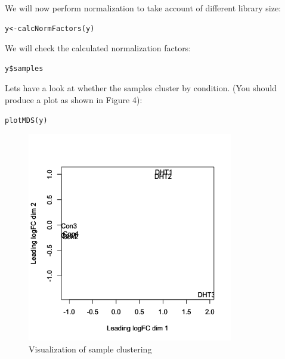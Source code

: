 \begin{steps}
We will now perform normalization to take account of different library size:
\begin{lstlisting}
y<-calcNormFactors(y)
\end{lstlisting}

We will check the calculated normalization factors:
\begin{lstlisting}
y$samples
\end{lstlisting}

Lets have a look at whether the samples cluster by condition. (You should produce a plot
as shown in Figure 4):
\begin{lstlisting}
plotMDS(y)
\end{lstlisting}
\end{steps}

\begin{figure}[H]
\centering
\includegraphics[width=0.8\textwidth]{handout/MDS.png}
\caption{Visualization of sample clustering}
\label{fig:MDS plot}
\end{figure}


